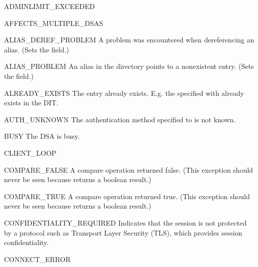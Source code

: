 \begin{excdesc}{ADMINLIMIT_EXCEEDED}

\end{excdesc}
\begin{excdesc}{AFFECTS_MULTIPLE_DSAS}

\end{excdesc}
\begin{excdesc}{ALIAS_DEREF_PROBLEM}
A problem was encountered when dereferencing an alias.
(Sets the  field.)
\end{excdesc}
\begin{excdesc}{ALIAS_PROBLEM}
An alias in the directory points to a nonexistent entry.
(Sets the  field.)
\end{excdesc}
\begin{excdesc}{ALREADY_EXISTS}
The entry already exists. E.g. the  specified with 
already exists in the DIT.
\end{excdesc}
\begin{excdesc}{}

\end{excdesc}
\begin{excdesc}{AUTH_UNKNOWN}
The authentication method specified to  is not known.
\end{excdesc}
\begin{excdesc}{BUSY}
The DSA is busy.
\end{excdesc}
\begin{excdesc}{CLIENT_LOOP}

\end{excdesc}
\begin{excdesc}{COMPARE_FALSE}
A compare operation returned false.
(This exception should never be seen because  returns
a boolean result.)
\end{excdesc}
\begin{excdesc}{COMPARE_TRUE}
A compare operation returned true.
(This exception should never be seen because  returns
a boolean result.)
\end{excdesc}
\begin{excdesc}{CONFIDENTIALITY_REQUIRED}
Indicates that the session is not protected by a protocol such
as Transport Layer Security (TLS), which provides session
confidentiality.
\end{excdesc}
\begin{excdesc}{CONNECT_ERROR}

\end{excdesc}
